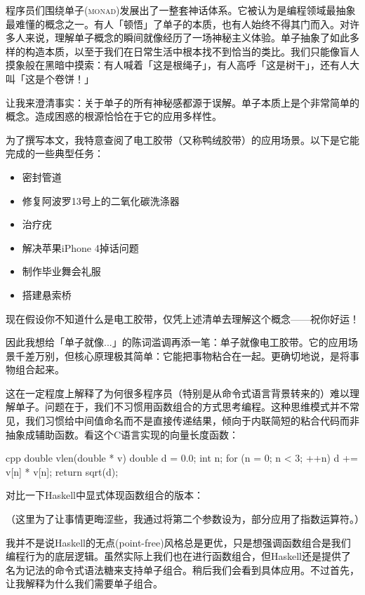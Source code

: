 
\lettrine[lhang=0.17]{程}{序员们围绕单子(monad)}发展出了一整套神话体系。它被认为是编程领域最抽象最难懂的概念之一。有人「顿悟」了单子的本质，也有人始终不得其门而入。对许多人来说，理解单子概念的瞬间就像经历了一场神秘主义体验。单子抽象了如此多样的构造本质，以至于我们在日常生活中根本找不到恰当的类比。我们只能像盲人摸象般在黑暗中摸索：有人喊着「这是根绳子」，有人高呼「这是树干」，还有人大叫「这是个卷饼！」

让我来澄清事实：关于单子的所有神秘感都源于误解。单子本质上是个非常简单的概念。造成困惑的根源恰恰在于它的应用多样性。

为了撰写本文，我特意查阅了电工胶带（又称鸭绒胶带）的应用场景。以下是它能完成的一些典型任务：

\begin{itemize}
  \tightlist
  \item
        密封管道
  \item
        修复阿波罗13号上的二氧化碳洗涤器
  \item
        治疗疣
  \item
        解决苹果iPhone 4掉话问题
  \item
        制作毕业舞会礼服
  \item
        搭建悬索桥
\end{itemize}

\noindent
现在假设你不知道什么是电工胶带，仅凭上述清单去理解这个概念——祝你好运！

因此我想给「单子就像...」的陈词滥调再添一笔：单子就像电工胶带。它的应用场景千差万别，但核心原理极其简单：它能把事物粘合在一起。更确切地说，是将事物组合起来。

这在一定程度上解释了为何很多程序员（特别是从命令式语言背景转来的）难以理解单子。问题在于，我们不习惯用函数组合的方式思考编程。这种思维模式并不常见，我们习惯给中间值命名而不是直接传递结果，倾向于内联简短的粘合代码而非抽象成辅助函数。看这个C语言实现的向量长度函数：

\begin{snip}{cpp}
double vlen(double * v) {
    double d = 0.0;
    int n;
    for (n = 0; n < 3; ++n)
        d += v[n] * v[n];
    return sqrt(d);
}
\end{snip}
对比一下Haskell中显式体现函数组合的版本：

（这里为了让事情更晦涩些，我通过将第二个参数设为，部分应用了指数运算符\code{(\^{})}。）

我并不是说Haskell的无点(point-free)风格总是更优，只是想强调函数组合是我们编程行为的底层逻辑。虽然实际上我们也在进行函数组合，但Haskell还是提供了名为记法的命令式语法糖来支持单子组合。稍后我们会看到具体应用。不过首先，让我解释为什么我们需要单子组合。

